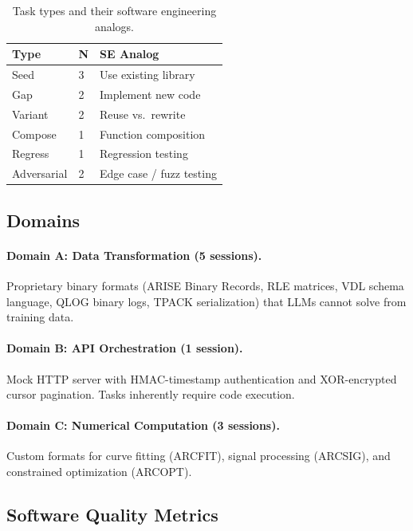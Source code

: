 \documentclass[10pt,twocolumn]{article}
\begin{document}
\begin{table}[t]
\centering
\footnotesize
\begin{tabular}{llp{3cm}}
\toprule
\textbf{Type} & \textbf{N} & \textbf{SE Analog} \\
\midrule
Seed & 3 & Use existing library \\
Gap & 2 & Implement new code \\
Variant & 2 & Reuse vs.\ rewrite \\
Compose & 1 & Function composition \\
Regress & 1 & Regression testing \\
Adversarial & 2 & Edge case / fuzz testing \\
\bottomrule
\end{tabular}
\caption{Task types and their software engineering analogs.}
\label{tab:task_types}
\end{table}

\subsection{Domains}

\paragraph{Domain A: Data Transformation (5 sessions).} Proprietary binary formats (ARISE Binary Records, RLE matrices, VDL schema language, QLOG binary logs, TPACK serialization) that LLMs cannot solve from training data.

\paragraph{Domain B: API Orchestration (1 session).} Mock HTTP server with HMAC-timestamp authentication and XOR-encrypted cursor pagination. Tasks inherently require code execution.

\paragraph{Domain C: Numerical Computation (3 sessions).} Custom formats for curve fitting (ARCFIT), signal processing (ARCSIG), and constrained optimization (ARCOPT).

\subsection{Software Quality Metrics}
\end{document}
